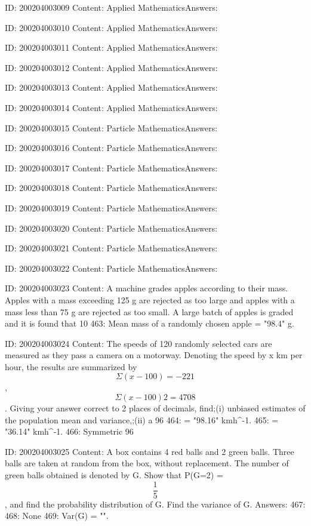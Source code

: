 \documentclass{article}
\begin{document}
ID: 200204003009
Content:
Applied MathematicsAnswers:

ID: 200204003010
Content:
Applied MathematicsAnswers:

ID: 200204003011
Content:
Applied MathematicsAnswers:

ID: 200204003012
Content:
Applied MathematicsAnswers:

ID: 200204003013
Content:
Applied MathematicsAnswers:

ID: 200204003014
Content:
Applied MathematicsAnswers:

ID: 200204003015
Content:
Particle MathematicsAnswers:

ID: 200204003016
Content:
Particle MathematicsAnswers:

ID: 200204003017
Content:
Particle MathematicsAnswers:

ID: 200204003018
Content:
Particle MathematicsAnswers:

ID: 200204003019
Content:
Particle MathematicsAnswers:

ID: 200204003020
Content:
Particle MathematicsAnswers:

ID: 200204003021
Content:
Particle MathematicsAnswers:

ID: 200204003022
Content:
Particle MathematicsAnswers:

ID: 200204003023
Content:
A machine grades apples according to their mass. Apples with a mass exceeding 125 g are rejected as too large and apples with a mass less than 75 g are rejected as too small. A large batch of apples is graded and it is found that 10%
463: Mean mass of a randomly chosen apple = "98.4" g.

ID: 200204003024
Content:
The speeds of 120 randomly selected cars are measured as they pass a camera on a motorway. Denoting the speed by x km per hour, the results are summarized by $$\Sigma (x-100) = -221$$, $$\Sigma (x-100)2=4708$$. Giving your answer correct to 2 places of decimals, find;(i) unbiased estimates of the population mean and variance,;(ii) a 96%
464: \hat{\mu} = "98.16" kmh^{-1}.
465: \hat{\sigma} = "36.14" kmh^{-1}.
466: Symmetric 96%

ID: 200204003025
Content:
A box contains 4 red balls and 2 green balls. Three balls are taken at random from the box, without replacement. The number of green balls obtained is denoted by G. Show that P(G=2) = $$\frac{1}{5}$$, and find the probability distribution of G. Find the variance of G. Answers:
467: 
468: None
469: Var(G) = "".
\end{document}
